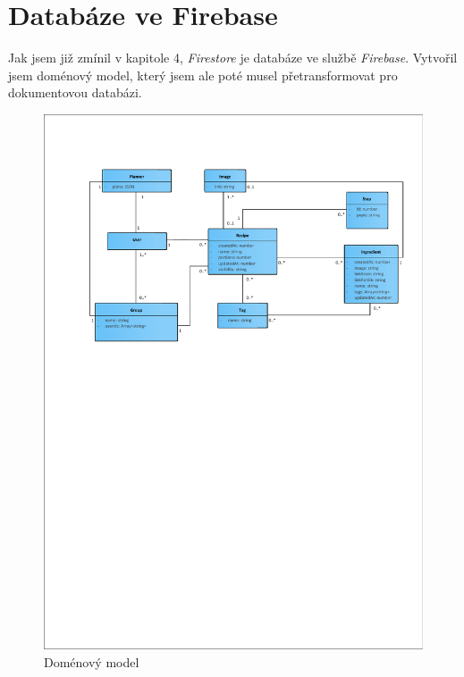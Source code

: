 \section{Databáze ve Firebase}
Jak jsem již zmínil v kapitole 4, \emph{Firestore} je databáze ve službě \emph{Firebase}. Vytvořil jsem doménový model, který jsem ale poté musel přetransformovat pro
dokumentovou databázi.
\begin{figure}[h]
    \includegraphics[width=\textwidth]{pdf/domain-model}
    \caption{Doménový model} \label{picture:recipeo:domain-model}
\end{figure}
